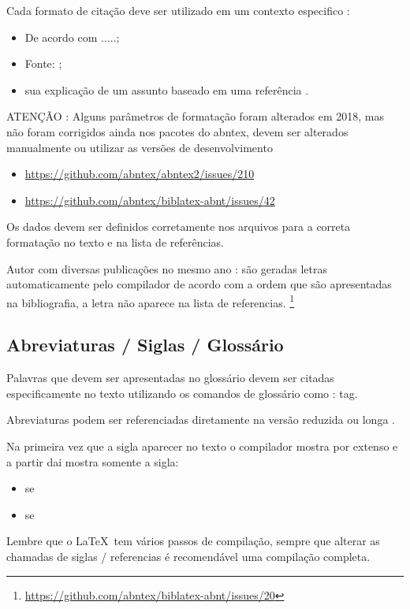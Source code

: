 Cada formato de citação deve ser utilizado em um contexto especifico :
\begin{itemize}
    \item De acordo com  .....;
    
    \item Fonte: ;
    
    \item sua explicação de um assunto baseado em uma referência \cite{SCRUMGUIDE:2013}.
    
\end{itemize}

ATENÇÃO : Alguns parâmetros de formatação foram alterados em 2018, mas não foram corrigidos ainda nos pacotes do \ac{abntex}, devem ser alterados manualmente ou utilizar as versões de desenvolvimento
\begin{itemize}
    \item \url{https://github.com/abntex/abntex2/issues/210}
    
    \item \url{https://github.com/abntex/biblatex-abnt/issues/42}
\end{itemize}

Os dados devem ser definidos corretamente nos arquivos  para a correta formatação no texto e na lista de referências.

Autor com diversas publicações no mesmo ano : são geradas letras automaticamente pelo compilador de acordo com a ordem que são apresentadas na bibliografia, a letra não aparece na lista de referencias. \footnote{\url{https://github.com/abntex/biblatex-abnt/issues/20}}


\subsection{Abreviaturas / Siglas / Glossário}
\label{siglas-glossario}

Palavras que devem ser apresentadas no glossário devem ser citadas especificamente no texto utilizando os comandos de glossário como : \gls{tag}.

Abreviaturas podem ser referenciadas diretamente na versão reduzida  \space  
ou longa .

Na primeira vez que a sigla aparecer no texto o compilador mostra por extenso e a partir dai mostra somente a sigla:

\begin{itemize}
    \item \gls{se}
    \item \gls{se}
\end{itemize}

Lembre que o \LaTeX \ tem vários passos de compilação, sempre que alterar as chamadas de siglas / referencias é recomendável uma compilação completa.




